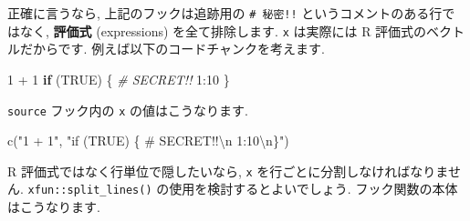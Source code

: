 \documentclass[
  11pt,
  lualatex,
  ja=standard]{bxjsreport}
\newenvironment{Shaded}{\begin{snugshade}}{\end{snugshade}}
\newcommand{\AttributeTok}[1]{\textcolor[rgb]{0.77,0.63,0.00}{#1}}
\newcommand{\CommentTok}[1]{\textcolor[rgb]{0.56,0.35,0.01}{\textit{#1}}}
\newcommand{\ConstantTok}[1]{\textcolor[rgb]{0.00,0.00,0.00}{#1}}
\newcommand{\ControlFlowTok}[1]{\textcolor[rgb]{0.13,0.29,0.53}{\textbf{#1}}}
\newcommand{\DecValTok}[1]{\textcolor[rgb]{0.00,0.00,0.81}{#1}}
\newcommand{\FunctionTok}[1]{\textcolor[rgb]{0.00,0.00,0.00}{#1}}
\newcommand{\NormalTok}[1]{#1}
\newcommand{\OtherTok}[1]{\textcolor[rgb]{0.56,0.35,0.01}{#1}}
\newcommand{\SpecialCharTok}[1]{\textcolor[rgb]{0.00,0.00,0.00}{#1}}
\newcommand{\StringTok}[1]{\textcolor[rgb]{0.31,0.60,0.02}{#1}}
\begin{document}
\begin{Shaded}
\end{Shaded}

正確に言うなら, 上記のフックは追跡用の \texttt{\# 秘密!!} というコメントのある行ではなく, \textbf{評価式} (expressions) を全て排除します. \texttt{x} は実際には R 評価式のベクトルだからです. 例えば以下のコードチャンクを考えます.

\begin{Shaded}
\begin{Highlighting}[numbers=left,,]
\DecValTok{1} \SpecialCharTok{+} \DecValTok{1}
\ControlFlowTok{if}\NormalTok{ (}\ConstantTok{TRUE}\NormalTok{) \{}
  \CommentTok{\# SECRET!!}
  \DecValTok{1}\SpecialCharTok{:}\DecValTok{10}
\NormalTok{\}}
\end{Highlighting}
\end{Shaded}

\texttt{source} フック内の \texttt{x} の値はこうなります.

\begin{Shaded}
\begin{Highlighting}[numbers=left,,]
\FunctionTok{c}\NormalTok{(}\StringTok{"1 + 1"}\NormalTok{, }\StringTok{"if (TRUE) \{ \# SECRET!!}\SpecialCharTok{\textbackslash{}n}\StringTok{  1:10}\SpecialCharTok{\textbackslash{}n}\StringTok{\}"}\NormalTok{)}
\end{Highlighting}
\end{Shaded}

R 評価式ではなく行単位で隠したいなら, \texttt{x} を行ごとに分割しなければなりません. \texttt{xfun::split\_lines()} の使用を検討するとよいでしょう. フック関数の本体はこうなります.

\begin{Shaded}
\end{Shaded}
\end{document}
